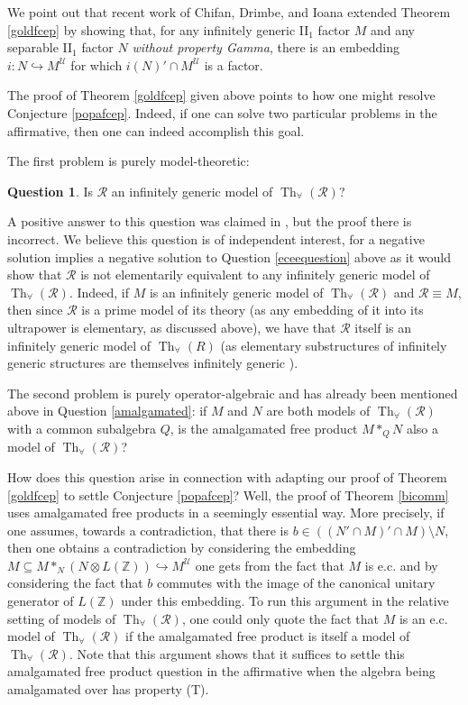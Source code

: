 \documentclass[12pt]{amsart}
\theoremstyle{definition}
\newtheorem{question}[thm]{Question}
\def\u{\mathsf 1}
\def \Th{\operatorname{Th}}
\def \R{\mathcal R}
\def \u{\mathcal U}
\begin{document}
We point out that recent work of Chifan, Drimbe, and Ioana \cite[Theorem 6.2]{CDI} extended Theorem \ref{goldfcep} by showing that, for any infinitely generic II$_1$ factor $M$ and any separable II$_1$ factor $N$ \emph{without property Gamma}, there is an embedding $i:N\hookrightarrow M^\u$ for which $i(N)'\cap M^\u$ is a factor.

The proof of Theorem \ref{goldfcep} given above points to how one might resolve Conjecture \ref{popafcep}.  Indeed, if one can solve two particular problems in the affirmative, then one can indeed accomplish this goal.

The first problem is purely model-theoretic:

\begin{question}\label{prob1}
Is $\R$ an infinitely generic model of $\Th_\forall(\R)$?
\end{question}

A positive answer to this question was claimed in \cite[Proposition 5.21]{ecfactors}, but the proof there is incorrect.  We believe this question is of independent interest, for a negative solution implies a negative solution to Question \ref{eceequestion} above as it would show that $\R$ is not elementarily equivalent to any infinitely generic model of $\Th_\forall(\R)$.  Indeed, if $M$ is an infinitely generic model of $\Th_\forall(\R)$ and $\R\equiv M$, then since $\R$ is a prime model of its theory (as any embedding of it into its ultrapower is elementary, as discussed above), we have that $\R$ itself is an infinitely generic model of $\Th_\forall(R)$ (as elementary substructures of infinitely generic structures are themselves infinitely generic \cite[Proposition 5.17]{ecfactors}). 

The second problem is purely operator-algebraic and has already been mentioned above in Question \ref{amalgamated}: if $M$ and $N$ are both models of $\Th_\forall(\R)$ with a common subalgebra $Q$, is the amalgamated free product $M*_QN$ also a model of $\Th_\forall(\R)$?

How does this question arise in connection with adapting our proof of Theorem \ref{goldfcep} to settle Conjecture \ref{popafcep}?  Well, the proof of Theorem \ref{bicomm} uses amalgamated free products in a seemingly essential way.  More precisely, if one assumes, towards a contradiction, that there is $b\in ((N'\cap M)'\cap M)\setminus N$, then one obtains a contradiction by considering the embedding $M\subseteq M*_N (N\otimes L(\mathbb{Z}))\hookrightarrow M^\u$ one gets from the fact that $M$ is e.c. and by considering the fact that $b$ commutes with the image of the canonical unitary generator of $L(\mathbb{Z})$ under this embedding.  To run this argument in the relative setting of models of $\Th_\forall(\R)$, one could only quote the fact that $M$ is an e.c. model of $\Th_\forall(\R)$ if the amalgamated free product is itself a model of $\Th_\forall(\R)$.  Note that this argument shows that it suffices to settle this amalgamated free product question in the affirmative when the algebra being amalgamated over has property (T).
\end{document}
